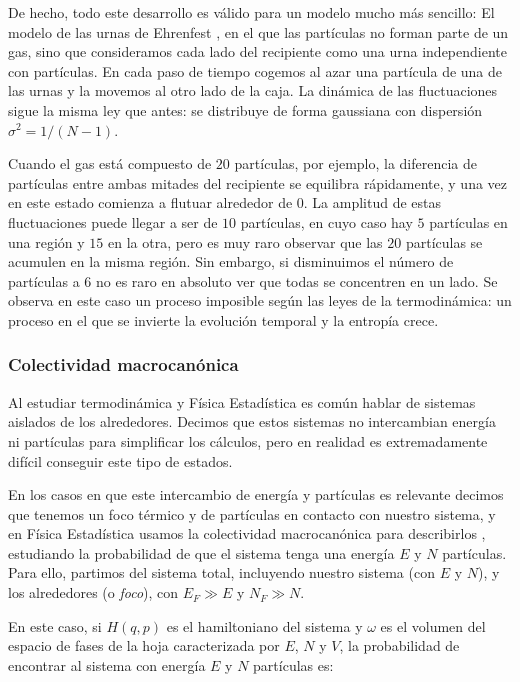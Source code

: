 \documentclass[11pt, a4paper]{article} %
\theoremstyle{named}
\begin{document}
De hecho, todo este desarrollo es válido para un modelo mucho más sencillo: El modelo de las urnas de Ehrenfest \cite{dorfman}, en el que las partículas no forman parte de un gas, sino que consideramos cada lado del recipiente como una urna independiente con partículas. En cada paso de tiempo cogemos al azar una partícula de una de las urnas y la movemos al otro lado de la caja. La dinámica de las fluctuaciones sigue la misma ley que antes: se distribuye de forma gaussiana con dispersión $\sigma^2 = 1/(N-1)$.

Cuando el gas está compuesto de $20$ partículas, por ejemplo, la diferencia de partículas entre ambas mitades del recipiente se equilibra rápidamente, y una vez en este estado comienza a flutuar alrededor de $0$. La amplitud de estas fluctuaciones puede llegar a ser de $10$ partículas, en cuyo caso hay $5$ partículas en una región y $15$ en la otra, pero es muy raro observar que las $20$ partículas se acumulen en la misma región. Sin embargo, si disminuimos el número de partículas a $6$ no es raro en absoluto ver que todas se concentren en un lado. Se observa en este caso un proceso imposible según las leyes de la termodinámica: un proceso en el que se invierte la evolución temporal y la entropía crece.

\subsubsection{Colectividad macrocanónica}\label{sec:macrocanonica}

Al estudiar termodinámica y Física Estadística es común hablar de sistemas aislados de los alrededores. Decimos que estos sistemas no intercambian energía ni partículas para simplificar los cálculos, pero en realidad es extremadamente difícil conseguir este tipo de estados.

En los casos en que este intercambio de energía y partículas es relevante decimos que tenemos un foco térmico y de partículas en contacto con nuestro sistema, y en Física Estadística usamos la colectividad macrocanónica para describirlos \cite{pathria}, estudiando la probabilidad de que el sistema tenga una energía $E$ y $N$ partículas. Para ello, partimos del sistema total, incluyendo nuestro sistema (con $E$ y $N$), y los alrededores (o \textit{foco}), con $E_F\gg E$ y $N_F \gg N$.

En este caso, si $H(q,p)$ es el hamiltoniano del sistema y $\omega$ es el volumen del espacio de fases de la hoja caracterizada por $E$, $N$ y $V$, la probabilidad de encontrar al sistema con energía $E$ y $N$ partículas es:
\end{document}
